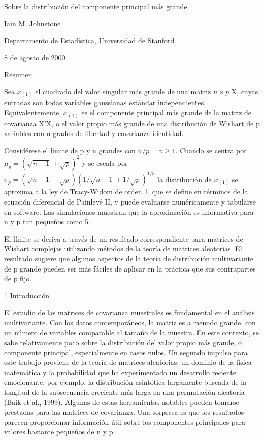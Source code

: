 \documentclass[11pt,a4paper]{article}
\begin{document}
Sobre la distribución del componente principal más grande

Iain M. Johnstone\*

Departamento de Estadística, Universidad de Stanford

8 de agosto de 2000

Resumen

Sea $x_{(1)}$ el cuadrado del valor singular más grande de una matriz $n \times p$ X, cuyas entradas son todas variables gaussianas estándar independientes. Equivalentemente, $x_{(1)}$ es el componente principal más grande de la matriz de covarianza X'X, o el valor propio más grande de una distribución de Wishart de p variables con n grados de libertad y covarianza identidad.

Considérese el límite de p y n grandes con $n/p = \gamma \ge 1$. Cuando se centra por $\mu_p = (\sqrt{n-1} + \sqrt{p})^2$ y se escala por $\sigma_p = (\sqrt{n-1} + \sqrt{p})(1/\sqrt{n-1} + 1/\sqrt{p})^{1/3}$ la distribución de $x_{(1)}$ se aproxima a la ley de Tracy-Widom de orden 1, que se define en términos de la ecuación diferencial de Painlevé II, y puede evaluarse numéricamente y tabularse en software. Las simulaciones muestran que la aproximación es informativa para n y p tan pequeños como 5.

El límite se deriva a través de un resultado correspondiente para matrices de Wishart complejas utilizando métodos de la teoría de matrices aleatorias. El resultado sugiere que algunos aspectos de la teoría de distribución multivariante de p grande pueden ser más fáciles de aplicar en la práctica que sus contrapartes de p fijo.

1 Introducción

El estudio de las matrices de covarianza muestrales es fundamental en el análisis multivariante. Con los datos contemporáneos, la matriz es a menudo grande, con un número de variables comparable al tamaño de la muestra. En este contexto, se sabe relativamente poco sobre la distribución del valor propio más grande, o componente principal, especialmente en casos nulos. Un segundo impulso para este trabajo proviene de la teoría de matrices aleatorias, un dominio de la física matemática y la probabilidad que ha experimentado un desarrollo reciente emocionante, por ejemplo, la distribución asintótica largamente buscada de la longitud de la subsecuencia creciente más larga en una permutación aleatoria (Baik et al., 1999). Algunas de estas herramientas notables pueden tomarse prestadas para las matrices de covarianza. Una sorpresa es que los resultados parecen proporcionar información útil sobre los componentes principales para valores bastante pequeños de n y p.
\end{document}
